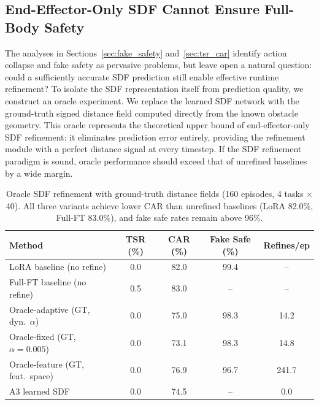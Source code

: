 \subsection{End-Effector-Only SDF Cannot Ensure Full-Body Safety}\label{sec:ee_only}

The analyses in Sections~\ref{sec:fake_safety} and~\ref{sec:tsr_car} identify action collapse and fake safety as pervasive problems, but leave open a natural question: could a sufficiently accurate SDF prediction still enable effective runtime refinement? To isolate the SDF representation itself from prediction quality, we construct an oracle experiment. We replace the learned SDF network with the ground-truth signed distance field computed directly from the known obstacle geometry. This oracle represents the theoretical upper bound of end-effector-only SDF refinement: it eliminates prediction error entirely, providing the refinement module with a perfect distance signal at every timestep. If the SDF refinement paradigm is sound, oracle performance should exceed that of unrefined baselines by a wide margin.

\begin{table}[t]
\centering
\caption{Oracle SDF refinement with ground-truth distance fields (160 episodes, 4 tasks $\times$ 40). All three variants achieve lower CAR than unrefined baselines (LoRA 82.0\%, Full-FT 83.0\%), and fake safe rates remain above 96\%.}
\label{tab:oracle}
\vspace{2pt}
\small
\begin{tabular}{lcccc}
\toprule
Method & TSR (\%) & CAR (\%) & Fake Safe (\%) & Refines/ep \\
\midrule
LoRA baseline (no refine) & 0.0 & 82.0 & 99.4 & -- \\
Full-FT baseline (no refine) & 0.5 & 83.0 & -- & -- \\
\midrule
Oracle-adaptive (GT, dyn.\ $\alpha$) & 0.0 & 75.0 & 98.3 & 14.2 \\
Oracle-fixed (GT, $\alpha{=}0.005$) & 0.0 & 73.1 & 98.3 & 14.8 \\
Oracle-feature (GT, feat.\ space) & 0.0 & 76.9 & 96.7 & 241.7 \\
\midrule
A3 learned SDF & 0.0 & 74.5 & -- & 0.0 \\
\bottomrule
\end{tabular}
\end{table}

